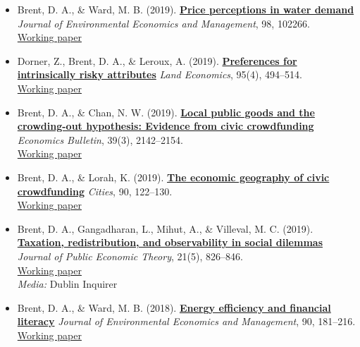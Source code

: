 \documentclass[
  11pt,
]{article}
\begin{document}
\begin{itemize}
{{  ready for alt-meat? Preferences and willingness to pay for meat
  alternatives in India}} \emph{Sustainability}, 12, 4377. (Open Access)
\item
  Brent, D. A., \& Ward, M. B. (2019).
  \textbf{\href{https://www.sciencedirect.com/science/article/pii/S0095069619300014}{Price
  perceptions in water demand}} \emph{Journal of Environmental Economics
  and Management}, 98, 102266.\\
  \href{assets/papers/brent_ward_price_perceptions_wp.pdf}{Working
  paper}
\item
  Dorner, Z., Brent, D. A., \& Leroux, A. (2019).
  \textbf{\href{https://le.uwpress.org/content/95/4/494.abstract}{Preferences
  for intrinsically risky attributes}} \emph{Land Economics}, 95(4),
  494--514.\\
  \href{assets/papers/dorner_brent_leroux_intrinsic_risk_wp.pdf}{Working
  paper}
\item
  Brent, D. A., \& Chan, N. W. (2019).
  \textbf{\href{https://ideas.repec.org/a/ebl/ecbull/eb-19-00112.html}{Local
  public goods and the crowding-out hypothesis: Evidence from civic
  crowdfunding}} \emph{Economics Bulletin}, 39(3), 2142--2154.\\
  \href{assets/papers/brent_chan_civic_crowdfunding_wp.pdf}{Working
  paper}
\item
  Brent, D. A., \& Lorah, K. (2019).
  \textbf{\href{https://www.sciencedirect.com/science/article/pii/S0264275118310382}{The
  economic geography of civic crowdfunding}} \emph{Cities}, 90,
  122--130.\\
  \href{assets/papers/brent_lorah_crowdfunding_wp.pdf}{Working paper}
\item
  Brent, D. A., Gangadharan, L., Mihut, A., \& Villeval, M. C. (2019).
  \textbf{\href{https://onlinelibrary.wiley.com/doi/10.1111/jpet.12377}{Taxation,
  redistribution, and observability in social dilemmas}} \emph{Journal
  of Public Economic Theory}, 21(5), 826--846.\\
  \href{https://papers.ssrn.com/sol3/papers.cfm?abstract_id=3047735}{Working
  paper}\\
  \emph{Media:} Dublin Inquirer
\item
  Brent, D. A., \& Ward, M. B. (2018).
  \textbf{\href{https://www.sciencedirect.com/science/article/pii/S0095069618300489}{Energy
  efficiency and financial literacy}} \emph{Journal of Environmental
  Economics and Management}, 90, 181--216.\\
  \href{assets/papers/brent_ward_energy_literacy_wp.pdf}{Working paper}

\end{itemize}
\end{document}

